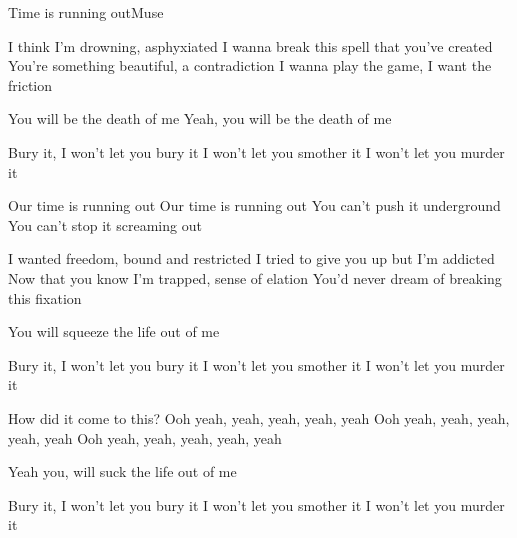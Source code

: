 \documentclass[a4paper,11pt,french]{article}
\begin{document}
\begin{Song}{Time is running out}{Muse}
\begin{multicols}{2}

\begin{Verse}
I think I'm drowning, asphyxiated
I wanna break this spell that you've created
You're something beautiful, a contradiction
I wanna play the game, I want the friction
\espaceInterStrophe

You will be the death of me
Yeah, you will be the death of me
\end{Verse}
\espaceInterStrophe

\begin{PreChorus}
Bury it, I won't let you bury it
I won't let you smother it
I won't let you murder it
\end{PreChorus}
\espaceInterStrophe

\begin{Chorus}
Our time is running out
Our time is running out
You can't push it underground
You can't stop it screaming out
\end{Chorus}
\espaceInterStrophe

\begin{Verse}
I wanted freedom, bound and restricted
I tried to give you up but I'm addicted
Now that you know I'm trapped, sense of elation
You'd never dream of breaking this fixation

You will squeeze the life out of me
\end{Verse}
\espaceInterStrophe

\begin{PreChorus}
Bury it, I won't let you bury it
I won't let you smother it
I won't let you murder it
\end{PreChorus}
\espaceInterStrophe

\tochorus
\espaceInterStrophe

\begin{Bridge}
How did it come to this?
Ooh yeah, yeah, yeah, yeah, yeah
Ooh yeah, yeah, yeah, yeah, yeah
Ooh yeah, yeah, yeah, yeah, yeah
\end{Bridge}
\espaceInterStrophe

\begin{Verse}
Yeah you, will suck the life out of me
\end{Verse}
\espaceInterStrophe

\begin{PreChorus}
Bury it, I won't let you bury it
I won't let you smother it
I won't let you murder it
\end{PreChorus}
\espaceInterStrophe


\end{multicols}
\end{Song}
\end{document}
